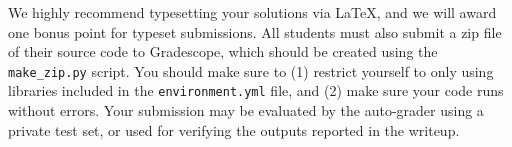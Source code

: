 We highly recommend typesetting your solutions via \LaTeX, and we will award one bonus point for typeset submissions. 
All students must also submit a zip file of
their source code to Gradescope, which should be created using the
\texttt{make\_zip.py} script. You
should make sure to (1) restrict yourself to only using libraries included in
the
\texttt{environment.yml} file, and (2) make sure your code runs without errors.
Your submission may be evaluated by the
auto-grader using a private test set, or used for verifying the outputs reported in the writeup. 


